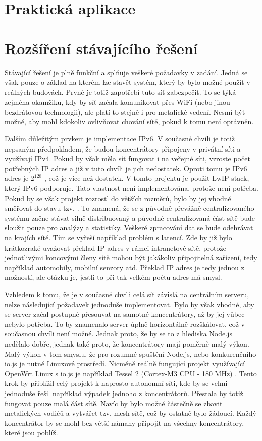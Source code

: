 \chapter{Praktická aplikace}

\chapter{Rozšíření stávajícího řešení}
Stávající řešení je plně funkční a splňuje veškeré požadavky v zadání. Jedná se však pouze o základ na kterém lze stavět systém, který by bylo možné použít v reálných budovách. Prvně je totiž zapotřebí tuto síť zabezpečit. To se týká zejména okamžiku, kdy by síť začala komunikovat přes WiFi (nebo jinou bezdrátovou technologii), ale platí to stejně i pro metalické vedení. Nesmí být možné, aby mohl kdokoliv ovlivňovat chování sítě, pokud k tomu není oprávněn.

Dalším důležitým prvkem je implementace IPv6. V současné chvíli je totiž nepsaným předpokladem, že budou koncentrátory připojeny v privátní síti a využívají IPv4. Pokud by však měla síť fungovat i na veřejné síti, vzroste počet potřebných IP adres a již v tuto chvíli je jich nedostatek. Oproti tomu je IPv6 adres je $2^{128}$ \cite{ripe}, což je více než dostatek. V tomto projektu je použit LwIP stack, který IPv6 podporuje. Tato vlastnost není implementována, protože není potřeba. Pokud by se však projekt rozrostl do větších rozměrů, bylo by jej vhodné směřovat do stavu tzv. . To znamená, že se z původně převážně centralizovaného systému začne stávat silně distribuovaný a původně centralizovaná část sítě bude sloužit pouze pro analýzy a statistiky. Veškeré zpracování dat se bude odehrávat na krajích sítě. Tím se vyřeší například problém s latencí. Zde by již bylo krátkozraké uvažovat překlad IP adres v rámci intranetové sítě, protože jednotlivými koncovými členy sítě mohou být jakákoliv připojitelná zařízení, tedy například automobily, mobilní senzory atd. Překlad IP adres je tedy jednou z možností, ale otázku je, jestli to při tak velkém počtu adres má smysl.

Vzhledem k tomu, že je v současné chvíli celá síť závislá na centrálním serveru, nelze následující požadavek jednoduše implementovat. Bylo by však vhodné, aby se server začal postupně přesouvat na samotné koncentrátory, až by jej vůbec nebylo potřeba. To by znamenalo server úplně horizontálně rozškálovat, což v současnou chvíli není možné. Jednak proto, že by se to z hlediska Node.js nedělalo dobře, jednak také proto, že koncentrátory mají poměrně malý výkon. Malý výkon v tom smyslu, že pro rozumné spuštění Node.js, nebo konkurenčního io.js je nutné Linuxové prostředí. Nicméně reálně fungující projekt využívající OpenWrt Linux \cite{openwrt} s io.js je například Tessel 2 (Cortex\texttrademark-M3 CPU - 180 MHz) \cite{tessel}. Tento krok by přiblížil celý projekt k naprosto autonomní síti, kde by se velmi jednoduše řešil například výpadek jednoho z koncentrátorů. Přestala by totiž fungovat pouze malá část sítě. Navíc by bylo možné částečně se zbavit metalických vodičů a vytvářet tzv. mesh sítě, což by ostatně bylo žádoucí. Každý koncentrátor by se mohl bez větší námahy připojit na všechny koncentrátory, které jsou poblíž.

